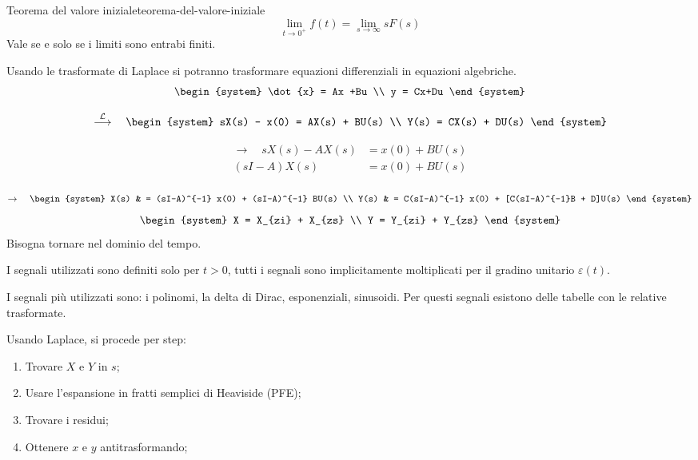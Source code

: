 \documentclass[12pt]{article}
\begin{document}
\begin{theorem}{Teorema del valore iniziale}{teorema-del-valore-iniziale}
    \[ \lim_{t \to 0^+} f(t) = \lim_{s \to \infty} sF(s) \]
    Vale se e solo se i limiti sono entrabi finiti.
\end{theorem}

Usando le trasformate di Laplace si potranno trasformare equazioni differenziali in equazioni algebriche.
\[ \begin{system} 
    \dot{x} = Ax +Bu \\
    y = Cx+Du
\end{system} \]

\[ \overset{\LL}{\longrightarrow}\quad \begin{system} 
    sX(s) - x(0) = AX(s) + BU(s) \\
    Y(s) = CX(s) + DU(s)
\end{system} \]

\begin{align*}
    \to\quad sX(s) - AX(s) & = x(0) + BU(s) \\
    (sI - A) X(s) & = x(0) + BU(s) \\
\end{align*}

\[ \to\quad \begin{system}
    X(s) & = (sI-A)^{-1} x(0) + (sI-A)^{-1} BU(s) \\
    Y(s) & = C(sI-A)^{-1} x(0) + [C(sI-A)^{-1}B + D]U(s)
\end{system} \]
\[ \begin{system}
    X = X_{zi} + X_{zs} \\
    Y = Y_{zi} + Y_{zs}
\end{system} \]
Bisogna tornare nel dominio del tempo.

I segnali utilizzati sono definiti solo per $t>0$, tutti i segnali sono implicitamente moltiplicati per il gradino unitario $\varepsilon(t)$.

I segnali pi\`u utilizzati sono: i polinomi, la delta di Dirac, esponenziali, sinusoidi. Per questi segnali esistono delle tabelle con le relative trasformate.

Usando Laplace, si procede per step:
\begin{enumerate}
    \item Trovare $X$ e $Y$ in $s$;
    \item Usare l'espansione in fratti semplici di Heaviside (PFE);
    \item Trovare i residui;
    \item Ottenere $x$ e $y$ antitrasformando;
\end{enumerate}
\end{document}
